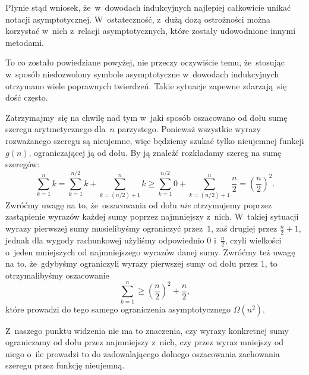\documentclass[a4paper,11pt]{article}
\numberwithin{equation}{section}
\begin{document}
Płynie stąd wniosek, że~w~dowodach indukcyjnych najlepiej całkowicie unikać
notacji asymptotycznej. W~ostateczność, z~dużą dozą ostrożności można
korzystać w~nich z~relacji asymptotycznych, które zostały udowodnione innymi
metodami.

To co zostało powiedziane powyżej, nie przeczy oczywiście temu, że~stosując
w~sposób niedozwolony symbole asymptotyczne w~dowodach indukcyjnych otrzymano
wiele poprawnych twierdzeń. Takie sytuacje zapewne zdarzają~się dość
często.

\VerSpaceFour





\noindent
{} Zatrzymajmy~się na chwilę nad tym w~jaki sposób oszacowano od dołu
sumę szeregu arytmetycznego dla~$n$ parzystego. Ponieważ wszystkie wyrazy
rozważanego szeregu są nieujemne, więc będziemy szukać tylko nieujemnej
funkcji $g( n )$, ograniczającej ją od dołu. By ją znaleźć rozkładamy szereg
na sumę szeregów:
\begin{equation}
  \label{eq:CormenAtAl-WprowadzenieDoAlgorytmow-21}
  \sum_{ k = 1 }^{ n } k =
  \sum_{ k = 1 }^{ n / 2 } k + \sum_{ k = ( n / 2 ) + 1 }^{ n } k \geq
  \sum_{ k = 1 }^{ n / 2 } 0 + \sum_{ k = ( n / 2 ) + 1 }^{ n } \frac{ n }{ 2 } =
  \left( \frac{ n }{ 2 } \right)^{ 2 }.
\end{equation}
Zwróćmy uwagę na to, że~oszacowania od dołu \textit{nie} otrzymujemy poprzez
zastąpienie wyrazów każdej sumy poprzez najmniejszy z~nich. W~takiej
sytuacji wyrazy pierwszej sumy musielibyśmy ograniczyć przez~$1$,
zaś drugiej przez $\frac{ n }{ 2 } + 1$, jednak dla wygody rachunkowej
użyliśmy odpowiednio $0$ i~$\frac{ n }{ 2 }$, czyli wielkości o~jeden
mniejszych od najmniejszego wyrazów danej sumy. Zwróćmy też uwagę na to,
że~gdybyśmy ograniczyli wyrazy pierwszej sumy od dołu przez $1$, to
otrzymalibyśmy oszacowanie
\begin{equation}
  \label{eq:CormenAtAl-WprowadzenieDoAlgorytmow-22}
  \sum_{ k = 1 }^{ n } \geq
  \left( \frac{ n }{ 2 } \right)^{ 2 } + \frac{ n }{ 2 },
\end{equation}
które prowadzi do tego samego ograniczenia asymptotycznego $\Omega( n^{ 2 } )$.

Z~naszego punktu widzenia nie ma to znaczenia, czy wyrazy konkretnej sumy
ograniczamy od dołu przez najmniejszy z~nich, czy przez wyraz mniejszy od
niego o~ile prowadzi to do zadowalającego dolnego oszacowania zachowania
szeregu przez funkcję nieujemną.

\VerSpaceFour
\end{document}
